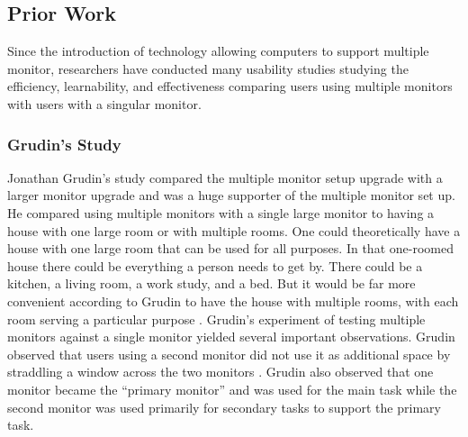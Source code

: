 \documentclass[a4paper]{article}
\begin{document}
\subsection{Prior Work}
Since the introduction of technology allowing computers to support multiple monitor, researchers have conducted many usability studies studying the efficiency, learnability, and effectiveness comparing users using multiple monitors with users with a singular monitor.

\subsubsection{Grudin's Study}
Jonathan Grudin's study compared the multiple monitor setup upgrade with a larger monitor upgrade and was a huge supporter of the multiple monitor set up. He compared using multiple monitors with a single large monitor to having a house with one large room or with multiple rooms. One could theoretically have a house with one large room that can be used for all purposes. In that one-roomed house there could be everything a person needs to get by. There could be a kitchen, a living room, a work study, and a bed. But it would be far more convenient according to Grudin to have the house with multiple rooms, with each room serving a particular purpose \cite{Grudin}. Grudin's experiment of testing multiple monitors against a single monitor yielded several important observations. Grudin observed that users using a second monitor did not use it as additional space by straddling a window across the two monitors \cite{Grudin}. Grudin also observed that one monitor became the ``primary monitor'' and was used for the main task while the second monitor was used primarily for secondary tasks to support the primary task.
\end{document}
